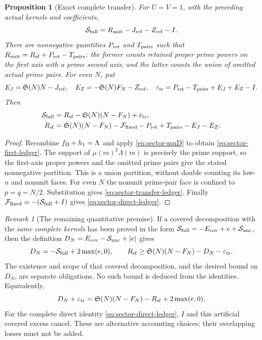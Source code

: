 \documentclass[11pt,a4paper]{article}
\newtheorem{proposition}[theorem]{Proposition}
\theoremstyle{definition}
\theoremstyle{remark}
\newtheorem{remark}[theorem]{Remark}
\begin{document}
\begin{proposition}[Exact complete transfer]
\label{prop:sector-transfer}
For $U=V=1$, with the preceding actual kernels and coefficients,
\begin{equation}
 \mathcal S_{\rm full}=R_{\rm unit}-J_{\rm ref}-Z_{\rm ref}-I.
 \label{eq:sector-first-ledger}
\end{equation}
There are nonnegative quantities $P_{\rm ret}$ and $T_{\rm pairs}$
such that
$R_{\rm unit}=R_{\rm sf}+P_{\rm ret}-T_{\rm pairs}$: the former
counts retained proper prime powers on the first axis with a prime
second axis, and the latter counts the union of omitted actual prime
pairs.  For even $N$, put
\[
 E_J=\mathfrak S(N)N-J_{\rm ref},\quad
 E_Z=-\mathfrak S(N)F_N-Z_{\rm ref},\quad
 \varepsilon_{\rm tr}=P_{\rm ret}-T_{\rm pairs}+E_J+E_Z-I.
\]
Then
\begin{align}
 \mathcal S_{\rm full}
 &=R_{\rm sf}-\mathfrak S(N)(N-F_N)+\varepsilon_{\rm tr},
 \label{eq:sector-transfer-ledger}\\
 R_{\rm sf}
 &=\mathfrak S(N)(N-F_N)-\mathcal F_{\rm fixed}
                         -P_{\rm ret}+T_{\rm pairs}-E_J-E_Z.
 \label{eq:sector-direct-ledger}
\end{align}
\end{proposition}
\begin{proof}
Recombine $f_{\rm II}+h_1=\Lambda$ and apply
\eqref{eq:sector-muD} to obtain \eqref{eq:sector-first-ledger}.
The support of $\mu(m)^2\Lambda(m)$ is precisely the prime support,
so the first-axis proper powers and the omitted prime pairs give the
stated nonnegative partition.  This is a union partition, without
double counting its low-$n$ and nonunit faces.  For even $N$ the
nonunit prime-pair face is confined to $p=q=N/2$.  Substitution gives
\eqref{eq:sector-transfer-ledger}.  Finally
$\mathcal F_{\rm fixed}=-(\mathcal S_{\rm full}+I)$ gives
\eqref{eq:sector-direct-ledger}.
\end{proof}

\begin{remark}[The remaining quantitative premise]
If a covered decomposition with the \emph{same complete kernels}
has been proved in the form
$\mathcal S_{\rm full}=-E_{\rm cov}+e+\mathcal S_{\rm unc}$,
then the definition
$D_N=E_{\rm cov}-\mathcal S_{\rm unc}+|e|$ gives
\[
 D_N=-\mathcal S_{\rm full}+2\max(e,0),\qquad
 R_{\rm sf}\geq\mathfrak S(N)(N-F_N)-D_N-\varepsilon_{\rm tr}.
\]
The existence and scope of that covered decomposition, and the desired
bound on $D_N$, are separate obligations.  No such bound is deduced
from the identities.  Equivalently,
\[
 D_N+\varepsilon_{\rm tr}
 =\mathfrak S(N)(N-F_N)-R_{\rm sf}+2\max(e,0).
\]
For the complete direct identity \eqref{eq:sector-direct-ledger}, $I$
and this artificial covered excess cancel.  These are alternative
accounting choices; their overlapping losses must not be added.
\end{remark}
\end{document}
